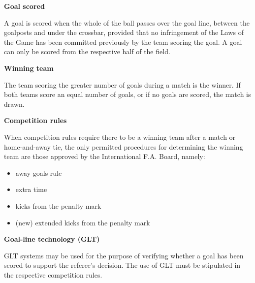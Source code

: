 \clearpage
\sffamily
{\bfseries\color[rgb]{0.4,0.4,0.4}{Law 10 -- The Method of Scoring} }
{}

\bigskip

{\bfseries Goal scored }

\headlinebox

A goal is scored when the whole of the ball passes over the goal line, between the goalposts and under the crossbar, provided that no infringement of the Laws of the Game has been committed previously by the team scoring the goal. A goal can only be scored from the respective half of the field.

\bigskip

{\bfseries Winning team}

\headlinebox

The team scoring the greater number of goals during a match is the winner. If both teams score an equal number of goals, or if no goals are scored, the match is drawn. 

\bigskip

{\bfseries Competition rules }

\headlinebox

When competition rules require there to be a winning team after a match or home-and-away tie, the only permitted procedures for determining the winning team are those approved by the International F.A. Board, namely:

\begin{itemize}
\item away goals rule
\item extra time
\item kicks from the penalty mark
\item (new) extended kicks from the penalty mark
\end{itemize}


{\bfseries Goal-line technology (GLT) }

\headlinebox

GLT systems may be used for the purpose of verifying whether a goal has been scored to support the referee{\textquoteright}s decision. The use of GLT must be stipulated in the respective competition rules.